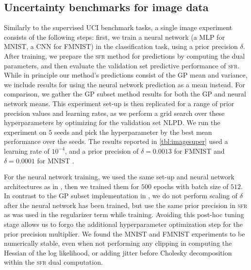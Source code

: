 \documentclass{article}
\newcommand{\our}{\textsc{sfr}\xspace}
\begin{document}
\subsection{Uncertainty benchmarks for image data}
\label{app:image}
Similarly to the supervised UCI benchmark tasks, a single image experiment consists of the following steps: first, we train a neural network (a MLP for MNIST, a CNN for FMNIST) in the classification task, using a prior precision $\delta$. After training, we prepare the \our method for predictions by computing the dual parameters, and then evaluate the validation set predictive performance of \our. While in principle our method's predictions consist of the GP mean and variance, we include results for using the neural network prediction as a mean instead. For comparison, we gather the GP subset method results for both the GP and neural network means. This experiment set-up is then replicated for a range of prior precision values and learning rates, as we perform a grid search over these hyperparameters by optimizing for the validation set NLPD. We run the experiment on $5$ seeds and pick the hyperparameter by the best mean performance over the seeds. The results reported in \cref{tbl:imagesuper} used a learning rate of $10^{-4}$, and a prior precision of $\delta = 0.0013$ for FMNIST and $\delta = 0.0001$ for MNIST . 


For the neural network training, we used the same set-up and neural network architectures as in \citet{immer2021improving}, then we trained them for $500$ epochs with batch size of $512$. In contrast to the GP subset implementation in \citet{immer2021improving}, we do not perform scaling of $\delta$ after the neural network has been trained, but use the same prior precision in \our as was used in the regularizer term while training. Avoiding this post-hoc tuning stage allows us to forgo the additional hyperparameter optimization step for the prior precision multiplier. We found the MNIST and FMNIST experiments to be numerically stable, even when not performing any clipping in computing the Hessian of the log likelihood, or adding jitter before Cholesky decomposition within the \our dual computation. 
\end{document}
